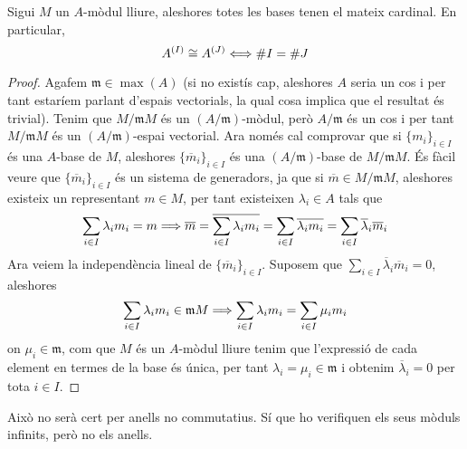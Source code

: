\documentclass[../../../main.tex]{subfiles}
\begin{document}
\begin{prop}
\label{prop:basesMateixCardinal} Sigui $M$ un $A$-mòdul lliure, aleshores totes les bases tenen el mateix cardinal. En particular,
\begin{equation}
    \notag
    A^{(I)}\cong A^{(J)} \Longleftrightarrow \#I = \#J
\end{equation}
\end{prop}
\begin{proof}
Agafem $\mathfrak{m}\in\max(A)$ (si no existís cap, aleshores $A$ seria un cos i per tant estaríem parlant d'espais vectorials, la qual cosa implica que el resultat és trivial). Tenim que $M/\mathfrak{m}M$ és un $(A/\mathfrak{m})$-mòdul, però $A/\mathfrak{m}$ és un cos i per tant $M/\mathfrak{m}M$ és un $(A/\mathfrak{m})$-espai vectorial. Ara només cal comprovar que si $\{m_i\}_{i\in I}$ és una $A$-base de $M$, aleshores $\{\overline{m}_i\}_{i\in I}$ és una $(A/\mathfrak{m})$-base de $M/\mathfrak{m}M$. És fàcil veure que $\{\overline{m}_i\}_{i\in I}$ és un sistema de generadors, ja que si $\overline{m}\in M/\mathfrak{m}M   $, aleshores existeix un representant $m\in M$, per tant existeixen $\lambda_i\in A$ tals que
\begin{equation}
    \notag
    \sum_{i\in I}\lambda_im_i = m\Longrightarrow \overline{m} = \overline{\sum_{i\in I}\lambda_im_i}=\sum_{i\in I}\overline{\lambda_im_i} = \sum_{i\in I}\overline{\lambda}_i\overline{m}_i
\end{equation}
Ara veiem la independència lineal de $\{\overline{m}_i\}_{i\in I}$. Suposem que $\sum_{i\in I}\overline{\lambda}_i\overline{m}_i = 0$, aleshores
\begin{equation}
    \notag
    \sum_{i\in I}\lambda_im_i\in\mathfrak{m}M\Longrightarrow \sum_{i\in I}\lambda_im_i = \sum_{i\in I}\mu_im_i
\end{equation}
on $\mu_i\in\mathfrak{m}$, com que $M$ és un $A$-mòdul lliure tenim que l'expressió de cada element en termes de la base és única, per tant $\lambda_i = \mu_i\in\mathfrak{m}$ i obtenim $\overline{\lambda}_i = 0$ per tota $i\in I$.
\end{proof}



Això no serà cert per anells no commutatius. Sí que ho verifiquen els seus mòduls infinits, però no els anells.
\end{document}
